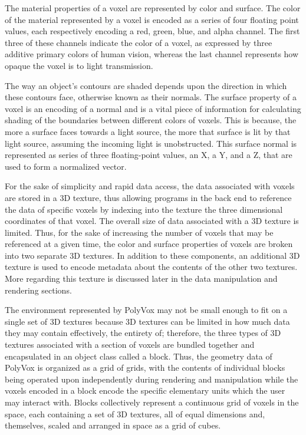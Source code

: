 \documentclass[onecolumn, draftclsnofoot,10pt, compsoc]{IEEEtran}
\newcounter{threesection}[subsubsection]
\newcounter{foursection}[threesection]
\begin{document}
The material properties of a voxel are represented by color and surface.
The color of the material represented by a voxel is encoded as a series of four floating point values, each respectively encoding a red, green, blue, and alpha channel.
The first three of these channels indicate the color of a voxel, as expressed by three additive primary colors of human vision, whereas the last channel represents how opaque the voxel is to light transmission.

The way an object’s contours are shaded depends upon the direction in which these contours face, otherwise known as their normals.
The surface property of a voxel is an encoding of a normal and is a vital piece of information for calculating shading of the boundaries between different colors of voxels.
This is because, the more a surface faces towards a light source, the more that surface is lit by that light source, assuming the incoming light is unobstructed.
This surface normal is represented as series of three floating-point values, an X, a Y, and a Z, that are used to form  a normalized vector.


For the sake of simplicity and rapid data access, the data associated with voxels are stored in a 3D texture, thus allowing programs in the back end to reference the data of specific voxels by indexing into the texture the three dimensional coordinates of that voxel.
The overall size of data associated with a 3D texture is limited. Thus, for the sake of increasing the number of voxels that may be referenced at a given time, the color and surface properties of voxels are broken into two separate 3D textures.
In addition to these components, an additional 3D texture is used to encode metadata about the contents of the other two textures.
More regarding this texture is discussed later in the data manipulation and rendering sections.

The environment represented by PolyVox may not be small enough to fit on a single set of 3D textures because 3D textures can be limited in how much data they may contain effectively, the entirety of;
therefore, the three types of 3D textures associated with a section of voxels are bundled together and encapsulated in an object class called a block.
Thus, the geometry data of PolyVox is organized as a grid of grids, with the contents of individual blocks being operated upon independently during rendering and manipulation while the voxels encoded in a block encode the specific elementary units which the user may interact with. 
Blocks collectively represent a continuous grid of voxels in the space, each containing a set of 3D textures, all of equal dimensions and, themselves, scaled and arranged in space as a grid of cubes.
\end{document}
